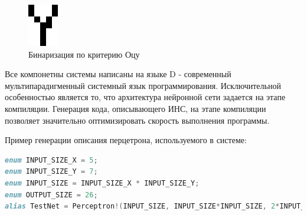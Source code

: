 \documentclass[russian,utf8,emptystyle]{eskdtext}
\begin{document}
\begin{figure}[!htb]
\includegraphics[width=\linewidth]{input-ex-otsu}
\caption{Бинаризация по критерию Оцу}
\endminipage\hfill
\end{figure}

Все компонетны системы написаны на языке D - современный мультипарадигменный системный язык программирования. Исключительной особенностью является то, что архитектура нейронной сети задается на этапе компиляции. Генерация кода, описывающего ИНС, на этапе компиляции позволяет значительно оптимизировать скорость выполнения программы.

Пример генерации описания перцетрона, используемого в системе:
\begin{lstlisting}[language=D]
enum INPUT_SIZE_X = 5;
enum INPUT_SIZE_Y = 7;
enum INPUT_SIZE = INPUT_SIZE_X * INPUT_SIZE_Y;
enum OUTPUT_SIZE = 26;
alias TestNet = Perceptron!(INPUT_SIZE, INPUT_SIZE*INPUT_SIZE, 2*INPUT_SIZE, OUTPUT_SIZE);
\end{lstlisting}
\end{document}
